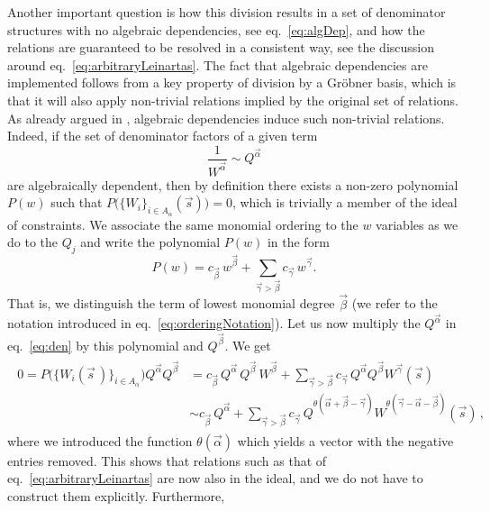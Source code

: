 Another important question is how this division results in a set of denominator
structures with no algebraic dependencies, see eq.~\eqref{eq:algDep}, and 
how the relations are guaranteed to be resolved in a consistent way,
see the discussion around eq.~\eqref{eq:arbitraryLeinartas}.
The fact that algebraic dependencies are implemented follows from a key property of
division by a Gröbner basis, which is that it will also apply non-trivial
relations implied by the original set of relations. As already argued in
\cite{raichev2012leinartas}, algebraic dependencies induce such non-trivial
relations. Indeed, if the set of denominator factors of a given term 
\begin{equation}
\label{eq:den}
\frac{1}{W^{\vec \alpha}} \sim Q^{\vec\alpha} 
\end{equation}
are algebraically dependent, then by
definition there exists a non-zero polynomial $P(w)$ such that
$P\big(\{ W_i\}_{i\in A_\alpha}(\vec s)\big) = 0$, which
is trivially a member of the ideal of constraints. 
We associate the same monomial ordering to the $w$ variables as we do to
the $Q_j$ and write the polynomial $P(w)$ in the form
\begin{equation}
    P(w) = c_{\vec\beta}\, w^{\vec\beta} + 
	\sum_{\vec\gamma > \vec\beta} c_{\vec\gamma}\, w^{\vec\gamma}.
\end{equation}
That is, we distinguish the term of lowest monomial degree $\vec\beta$ 
(we refer to the notation introduced in eq.~\eqref{eq:orderingNotation}). 
Let us now multiply the $Q^{\vec\alpha}$ in eq.~\eqref{eq:den} by this polynomial and 
$Q^{\vec\beta}$. We get
\begin{align}\begin{split}
    0=P\big(\{ W_i(\vec{s}\,)\}_{i\in A_\alpha}\big) Q^{\vec \alpha} Q^{\vec \beta}&= c_{\vec\beta}\,Q^{\vec\alpha} \,Q^{\vec\beta} \,W^{\vec\beta}    + 
  \sum_{\vec\gamma > \vec\beta} c_{\vec\gamma} \,
  Q^{\vec\alpha} Q^{\vec\beta}
  W^{\vec\gamma}(\vec s) \\
    &\sim  c_{\vec\beta}\,Q^{\vec\alpha}     + 
  \sum_{\vec\gamma > \vec\beta} c_{\vec\gamma} \,
    Q^{\theta(\vec\alpha + \vec\beta - \vec\gamma)} 
    W^{\theta(\vec\gamma - \vec\alpha - \vec\beta)}(\vec s)\,,
\end{split}\end{align}
where we introduced the function
$\theta(\vec\alpha)$ which yields a vector with the
negative entries removed. This shows that relations such 
as that of eq.~\eqref{eq:arbitraryLeinartas} are now also in the ideal, 
and we do not have to construct them explicitly. Furthermore,
